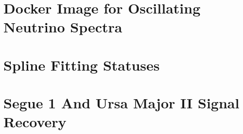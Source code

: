 \section{Docker Image for Oscillating Neutrino Spectra}\label{sec:apdx_nu_spec}


\clearpage

\section{Spline Fitting Statuses} \label{sec:apdx_nu_splines}

\begin{figure}[ht]
    \caption{}
    \label{fig:apdx_nu_splines}
\end{figure}

\clearpage
\section{Segue 1 And Ursa Major II Signal Recovery} \label{sec:apdx_TS_per_src}
